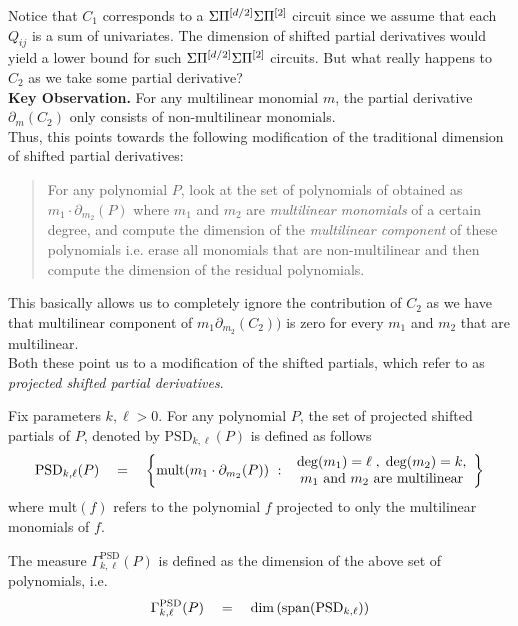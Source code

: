 Notice that $C_1$ corresponds to a $\Sigma\Pi^{[d/2]}\Sigma\Pi^{[2]}$ circuit since we assume that each $Q_{ij}$ is a sum of univariates. The dimension of shifted partial derivatives would yield a lower bound for such $\Sigma\Pi^{[d/2]}\Sigma\Pi^{[2]}$ circuits. But what really happens to $C_2$ as we take some partial derivative?\\

{\bf Key Observation. } For any multilinear monomial $m$, the partial derivative $\partial_m(C_2)$ only consists of non-multilinear monomials. \\

Thus, this points towards the following modification of the traditional dimension of shifted partial derivatives: 
\begin{quote}
  For any polynomial $P$, look at the set of polynomials of obtained as $m_1 \cdot \partial_{m_2}(P)$ where $m_1$ and $m_2$ are \emph{multilinear monomials} of a certain degree, and compute the dimension of the \emph{multilinear component} of these polynomials i.e. erase all monomials that are non-multilinear and then compute the dimension of the residual polynomials. 
\end{quote}
This basically allows us to completely ignore the contribution of $C_2$ as we have that multilinear component of $m_1 \partial_{m_2}(C_2))$ is zero for every $m_1$ and $m_2$ that are multilinear. \\


Both these point us to a modification of the shifted partials, which \cite{KLSS,KS14} refer to as \emph{projected shifted partial derivatives}. 

\begin{definition}
Fix parameters $k,\ell > 0$. For any polynomial $P$, the set of projected shifted partials of $P$, denoted by $\mathrm{PSD}_{k,\ell}(P)$ is defined as follows
\[
\mathrm{PSD}_{k,\ell}(P) \quad = \quad \left\{{\mathrm{mult}(m_1 \cdot \partial_{m_2}(P))}\ : \ {\begin{array}{c}\deg(m_1) = \ell\;,\; \deg(m_2) = k,\\ \text{$m_1$ and $m_2$ are multilinear}\end{array}}\right\}
\]
where $\mathrm{mult}(f)$ refers to the polynomial $f$ projected to only the multilinear monomials of $f$. 

The measure $\Gamma^{\mathrm{PSD}}_{k,\ell}(P)$ is defined as the dimension of the above set of polynomials, i.e.
\[\Gamma^{\mathrm{PSD}}_{k,\ell}(P) \quad = \quad \dim\left(\mathrm{span}(\mathrm{PSD}_{k,\ell})\right)\]
\end{definition}

